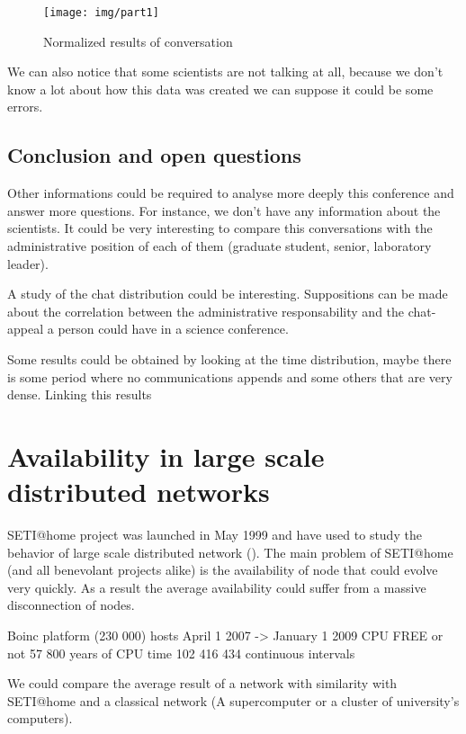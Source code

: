\documentclass{sig-alternate-10pt}
\begin{document}
\begin{figure}[h]
\begin{center}
\texttt{[image: img/part1]}
\end{center}
\caption{Normalized results of conversation}
\end{figure}

We can also notice that some scientists are not talking at all, because we don't know 
a lot about how this data was created we can suppose it could be some errors.

\subsection{Conclusion and open questions}

Other informations could be required to analyse more deeply this conference and answer more questions. 
For instance, we don't 
have any information about the scientists. It could be very interesting to compare this conversations
with the administrative position of each of them (graduate student, senior, laboratory leader).

A study of the chat distribution could be interesting. Suppositions can be made about the correlation
between the administrative responsability and the chat-appeal a person could have in a science conference.

Some results could be obtained by looking at the time distribution, maybe there is some period where
no communications appends and some others that are very dense. Linking this results



\section{Availability in large scale distributed networks}

SETI@home project was launched in May 1999 and have used to study the behavior of 
large scale distributed network (\cite{ja_ko_mascots09}). The main problem of SETI@home
(and all benevolant projects alike) is the availability of node that could evolve very quickly.
As a result the average availability could suffer from a massive disconnection of nodes.

Boinc platform (230 000) hosts
April 1 2007 -> January 1 2009
CPU FREE or not
57 800 years of CPU time
102 416 434 continuous intervals

We could compare the average result of a network with similarity with SETI@home and a classical
network (A supercomputer or a cluster of university's computers).
\end{document}
